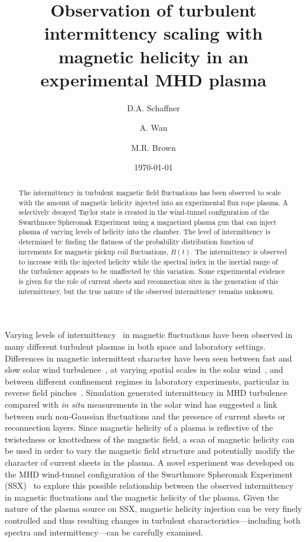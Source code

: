 \documentclass[aip,prl,amsmath,amssymb,reprint,superscriptaddress]{revtex4-1} %
\begin{document}
\title{Observation of turbulent intermittency scaling with magnetic helicity in an experimental MHD plasma}

\author{D.A. Schaffner}
\author{A. Wan}
\author{M.R. Brown}
\date{\today}
\begin{abstract}
The intermittency in turbulent magnetic field fluctuations has been observed to scale with the amount of magnetic helicity injected into an experimental flux rope plasma. A selectively decayed Taylor state is created in the wind-tunnel configuration of the Swarthmore Spheromak Experiment using a magnetized plasma gun that can inject plasma of varying levels of helicity into the chamber. The level of intermittency is determined by finding the flatness of the probability distribution function of increments for magnetic pickup coil fluctuations, $\dot{B}(t)$. The intermittency is observed to increase with the injected helicity while the spectral index in the inertial range of the turbulence appears to be unaffected by this variation. Some experimental evidence is given for the role of current sheets and reconnection sites in the generation of this intermittency, but the true nature of the observed intermittency remains unknown.
\end{abstract}

\maketitle

Varying levels of intermittency~\cite{frisch95} in magnetic fluctuations have been observed in many different turbulent plasmas in both space and laboratory settings. Differences in magnetic intermittent character have been seen between fast and slow solar wind turbulence~\cite{sorrisovalvo99}, at varying spatial scales in the solar wind~\cite{wan12}, and between different confinement regimes in laboratory experiments, particular in reverse field pinches~\cite{sorrisovalvo01,marrelli05}. Simulation generated intermittency in MHD turbulence~\cite{Greco08,Greco09,Wan09,Servidio11b} compared with {\it in situ} measurements in the solar wind has suggested a link between such non-Gaussian fluctuations and the presence of current sheets or reconnection layers. Since magnetic helicity of a plasma is reflective of the twistedness or knottedness of the magnetic field, a scan of magnetic helicity can be used in order to vary the magnetic field structure and potentially modify the character of current sheets in the plasma. A novel experiment was developed on the MHD wind-tunnel configuration of the Swarthmore Spheromak Experiment (SSX)~\cite{Gray13,schaffner14} to explore this possible relationship between the observed intermittency in magnetic fluctuations and the magnetic helicity of the plasma. Given the nature of the plasma source on SSX, magnetic helicity injection can be very finely controlled and thus resulting changes in turbulent characteristics---including both spectra and intermittency---can be carefully examined.
\end{document}
